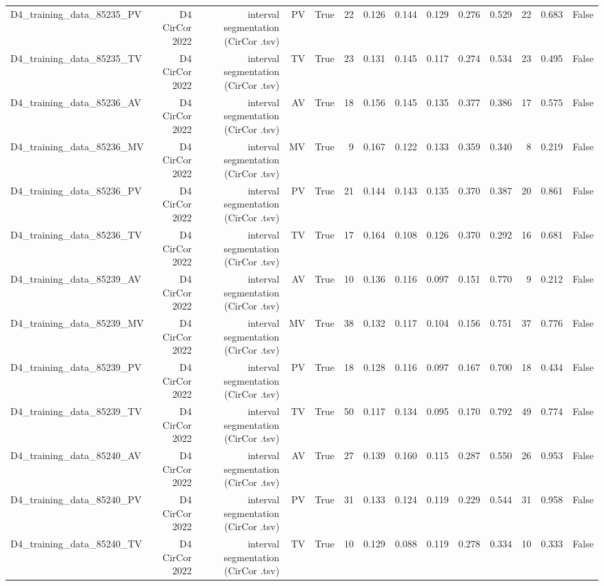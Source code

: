 \begin{table}[htbp]
\begin{tabular}{lrrrrrrrrrrrrr}
    D4\_training\_data\_85235\_PV & D4 CirCor 2022 & interval segmentation (CirCor .tsv) & PV & True & 22 & 0.126 & 0.144 & 0.129 & 0.276 & 0.529 & 22 & 0.683 & False \\
    D4\_training\_data\_85235\_TV & D4 CirCor 2022 & interval segmentation (CirCor .tsv) & TV & True & 23 & 0.131 & 0.145 & 0.117 & 0.274 & 0.534 & 23 & 0.495 & False \\
    D4\_training\_data\_85236\_AV & D4 CirCor 2022 & interval segmentation (CirCor .tsv) & AV & True & 18 & 0.156 & 0.145 & 0.135 & 0.377 & 0.386 & 17 & 0.575 & False \\
    D4\_training\_data\_85236\_MV & D4 CirCor 2022 & interval segmentation (CirCor .tsv) & MV & True & 9 & 0.167 & 0.122 & 0.133 & 0.359 & 0.340 & 8 & 0.219 & False \\
    D4\_training\_data\_85236\_PV & D4 CirCor 2022 & interval segmentation (CirCor .tsv) & PV & True & 21 & 0.144 & 0.143 & 0.135 & 0.370 & 0.387 & 20 & 0.861 & False \\
    D4\_training\_data\_85236\_TV & D4 CirCor 2022 & interval segmentation (CirCor .tsv) & TV & True & 17 & 0.164 & 0.108 & 0.126 & 0.370 & 0.292 & 16 & 0.681 & False \\
    D4\_training\_data\_85239\_AV & D4 CirCor 2022 & interval segmentation (CirCor .tsv) & AV & True & 10 & 0.136 & 0.116 & 0.097 & 0.151 & 0.770 & 9 & 0.212 & False \\
    D4\_training\_data\_85239\_MV & D4 CirCor 2022 & interval segmentation (CirCor .tsv) & MV & True & 38 & 0.132 & 0.117 & 0.104 & 0.156 & 0.751 & 37 & 0.776 & False \\
    D4\_training\_data\_85239\_PV & D4 CirCor 2022 & interval segmentation (CirCor .tsv) & PV & True & 18 & 0.128 & 0.116 & 0.097 & 0.167 & 0.700 & 18 & 0.434 & False \\
    D4\_training\_data\_85239\_TV & D4 CirCor 2022 & interval segmentation (CirCor .tsv) & TV & True & 50 & 0.117 & 0.134 & 0.095 & 0.170 & 0.792 & 49 & 0.774 & False \\
    D4\_training\_data\_85240\_AV & D4 CirCor 2022 & interval segmentation (CirCor .tsv) & AV & True & 27 & 0.139 & 0.160 & 0.115 & 0.287 & 0.550 & 26 & 0.953 & False \\
    D4\_training\_data\_85240\_PV & D4 CirCor 2022 & interval segmentation (CirCor .tsv) & PV & True & 31 & 0.133 & 0.124 & 0.119 & 0.229 & 0.544 & 31 & 0.958 & False \\
    D4\_training\_data\_85240\_TV & D4 CirCor 2022 & interval segmentation (CirCor .tsv) & TV & True & 10 & 0.129 & 0.088 & 0.119 & 0.278 & 0.334 & 10 & 0.333 & False \\

\end{tabular}
\end{table}
